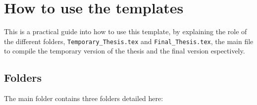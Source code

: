 \chapter{How to use the templates} \label{ch-2}

This is a practical guide into how to use this template, by explaining the role of the different folders, \texttt{Temporary\_Thesis.tex} and  \texttt{Final\_Thesis.tex}, the main file to compile the temporary version of the thesis and the final version espectively.

\section{Folders}

The main folder contains three folders detailed here:

